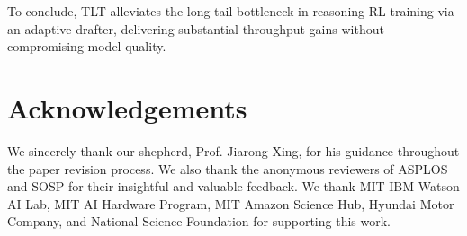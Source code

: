 \documentclass[sigplan,screen]{acmart}
\newcommand{\SysName}{\textrm{TLT}\xspace}
\begin{document}
To conclude, \SysName alleviates the long-tail bottleneck in reasoning RL training via an adaptive drafter, delivering substantial throughput gains without compromising model quality.







\section*{Acknowledgements}
We sincerely thank our shepherd, Prof. Jiarong Xing, for his guidance throughout the paper revision process. We also thank the anonymous reviewers of ASPLOS and SOSP for their insightful and valuable feedback.
We thank MIT-IBM Watson AI Lab, MIT AI Hardware Program, MIT Amazon Science Hub, Hyundai Motor Company, and National Science Foundation for supporting this work.

%
%

\end{document}
